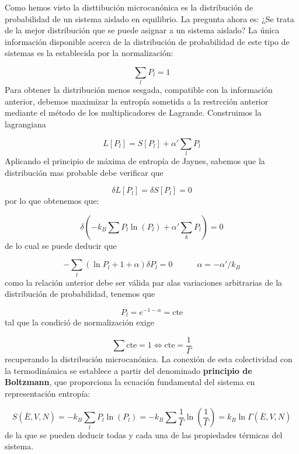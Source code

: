 \documentclass[12pt,a4paper]{article}
\numberwithin{equation}{section}
\numberwithin{figure}{section}
\newcommand{\tquad}{\quad \quad \quad}
\newcommand{\parentesis}[1]{\left( #1  \right)}
\newcommand{\cte}{\mathrm{cte}}
\theoremstyle{definition}
\begin{document}
Como hemos visto la disttibución microcanónica es la distribución de probabilidad de un sistema aislado en equilibrio. La pregunta ahora es: ¿Se trata de la mejor distribución que se puede asignar a un sistema aislado? La única información disponible acerca de la distribución de probabilidad de este tipo de sistemas es  la establecida por la normalización:

\begin{equation}
\sum_l P_l = 1
\end{equation}
Para obtener la distribución menos sesgada, compatible con la información anterior, debemos maximizar la entropía sometida a la restrcción anterior mediante el método de los multiplicadores de Lagrande. Construimos la lagrangiana 

\begin{equation}
L[P_l]=S[P_l] + \alpha' \sum_l P_l
\end{equation}
Aplicando el principio de máxima de entropía de Jaynes, sabemos que la distribución mas probable debe verificar que

\begin{equation}
\delta L[P_l] =  \delta  S[P_l] = 0
\end{equation}
por lo que obtenemos que:

$$ \delta \parentesis{- k_B \sum P_l \ln (P_l) + \alpha' \sum_k P_l}=0 $$
de lo cual se puede deducir que

\begin{equation}
- \sum_l (\ln P_l + 1 + \alpha ) \delta P_l = 0 \tquad \alpha = - \alpha'/k_B
\end{equation}
como la relación anterior debe ser válida par alas variaciones arbitrarias de la distribución de probabilidad, tenemos que

\begin{equation}
P_l = e^{-1-\alpha} = \cte
\end{equation}
tal que la condició de normalización exige

\begin{equation}
\sum \cte  = 1 \Leftrightarrow \cte = \frac{1}{\Gamma}
\end{equation}
recuperando la distribución microcanónica. La conexión de esta colectividad con la termodinámica se establece a partir del denominado \textbf{principio de Boltzmann}, que proporciona la ecuación fundamental del sistema en representación entropía:

\begin{equation}
S (\bar{E},V,N) = - k_B \sum_l P_l \ln (P_l) = - k_B \sum \frac{1}{\Gamma} \ln \parentesis{\frac{1}{\Gamma}} = k_B \ln \Gamma (\bar{E},V,N)
\end{equation}
de la que se pueden deducir todas y cada una de las propiedades térmicas del sistema. \\
\end{document}
